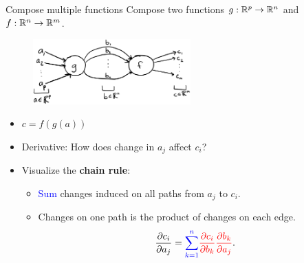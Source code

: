 \documentclass[usenames,dvipsnames,notes,11pt,aspectratio=169]{beamer}
\begin{document}
\begin{frame}
{Compose multiple functions}
Compose two functions $g:\mathbb{R}^{p}\to\mathbb{R}^{n}$ and $f:\mathbb{R}^{n}\to\mathbb{R}^{m}$.
\begin{figure}
\includegraphics[height=2.5cm]{figures/two-fn-comp-graph-partials}
\end{figure}

\begin{itemize}
    \item $c=f(g(a))$
\item Derivative: How does change in $a_j$ affect $c_i$?
\item Visualize the \textbf{chain rule}:
\begin{itemize}
\item \textcolor{blue}{Sum} changes induced on all paths from $a_j$ to $c_i$.
\item Changes on one path is the {\color{red}product} of changes on each edge.
\[
\frac{\partial c_{i}}{\partial a_{j}}={\color{blue}\sum_{k=1}^{n}}
{\color{red} \frac{\partial c_{i}}{\partial b_{k}}\frac{\partial b_{k}}{\partial a_{j}}} .
\]
\end{itemize} 
\end{itemize}
\end{frame}
\end{document}
